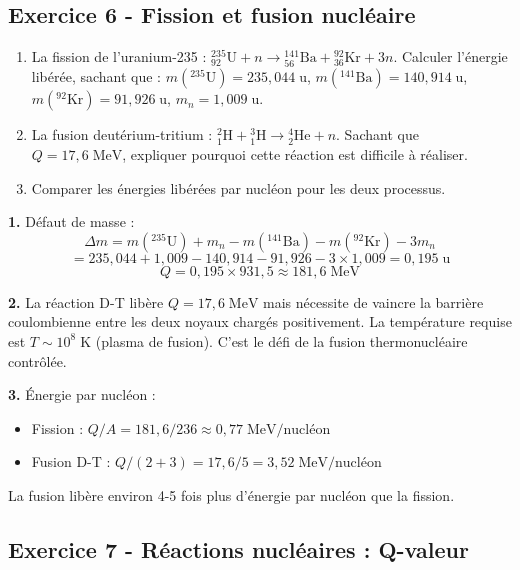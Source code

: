 \documentclass[12pt,a4paper]{article}
\begin{document}
\subsection*{Exercice 6 - Fission et fusion nucléaire \niveau{\moyen}}

\begin{boiteexercice}
\begin{enumerate}
  \item La fission de l'uranium-235 : ${}^{235}_{92}\text{U} + n \to {}^{141}_{56}\text{Ba} + {}^{92}_{36}\text{Kr} + 3n$. Calculer l'énergie libérée, sachant que :
  $m({}^{235}\text{U}) = 235{,}044\;\text{u}$, $m({}^{141}\text{Ba}) = 140{,}914\;\text{u}$, $m({}^{92}\text{Kr}) = 91{,}926\;\text{u}$, $m_n = 1{,}009\;\text{u}$.
  \item La fusion deutérium-tritium : ${}^2_1\text{H} + {}^3_1\text{H} \to {}^4_2\text{He} + n$. Sachant que $Q = 17{,}6\;\text{MeV}$, expliquer pourquoi cette réaction est difficile à réaliser.
  \item Comparer les énergies libérées par nucléon pour les deux processus.
\end{enumerate}
\end{boiteexercice}

\begin{boitecorrige}
\textbf{1.} Défaut de masse :
\[
\Delta m = m({}^{235}\text{U}) + m_n - m({}^{141}\text{Ba}) - m({}^{92}\text{Kr}) - 3m_n
\]
\[
= 235{,}044 + 1{,}009 - 140{,}914 - 91{,}926 - 3\times1{,}009 = 0{,}195\;\text{u}
\]
\[
Q = 0{,}195\times931{,}5 \approx 181{,}6\;\text{MeV}
\]

\textbf{2.} La réaction D-T libère $Q=17{,}6\;\text{MeV}$ mais nécessite de vaincre la barrière coulombienne entre les deux noyaux chargés positivement. La température requise est $T \sim 10^8\;\text{K}$ (plasma de fusion). C'est le défi de la fusion thermonucléaire contrôlée.

\textbf{3.} Énergie par nucléon :
\begin{itemize}[nosep]
  \item Fission : $Q/A = 181{,}6/236 \approx 0{,}77\;\text{MeV/nucléon}$
  \item Fusion D-T : $Q/(2+3) = 17{,}6/5 = 3{,}52\;\text{MeV/nucléon}$
\end{itemize}
La fusion libère environ 4-5 fois plus d'énergie par nucléon que la fission.
\end{boitecorrige}

\subsection*{Exercice 7 - Réactions nucléaires : Q-valeur \niveau{\moyen}}
\end{document}
